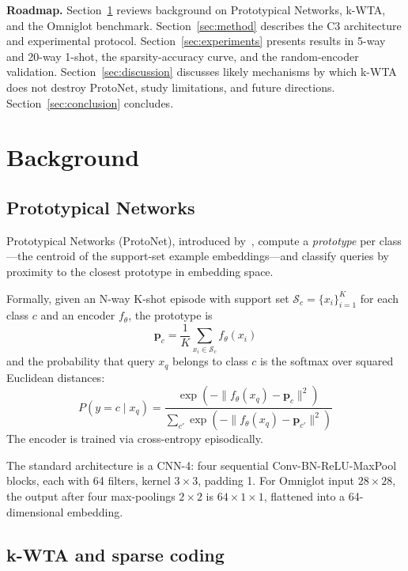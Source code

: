 \documentclass[11pt]{article}
\begin{document}
\textbf{Roadmap.} Section~\ref{sec:background} reviews background on Prototypical Networks, k-WTA, and the Omniglot benchmark. Section~\ref{sec:method} describes the C3 architecture and experimental protocol. Section~\ref{sec:experiments} presents results in 5-way and 20-way 1-shot, the sparsity-accuracy curve, and the random-encoder validation. Section~\ref{sec:discussion} discusses likely mechanisms by which k-WTA does not destroy ProtoNet, study limitations, and future directions. Section~\ref{sec:conclusion} concludes.

\section{Background}
\label{sec:background}

\subsection{Prototypical Networks}

Prototypical Networks (ProtoNet), introduced by~\citet{snell2017prototypical}, compute a \emph{prototype} per class---the centroid of the support-set example embeddings---and classify queries by proximity to the closest prototype in embedding space.

Formally, given an N-way K-shot episode with support set $\mathcal{S}_c = \{x_i\}_{i=1}^K$ for each class $c$ and an encoder $f_\theta$, the prototype is
\begin{equation}
\mathbf{p}_c = \frac{1}{K} \sum_{x_i \in \mathcal{S}_c} f_\theta(x_i)
\end{equation}
and the probability that query $x_q$ belongs to class $c$ is the softmax over squared Euclidean distances:
\begin{equation}
P(y=c \mid x_q) = \frac{\exp(-\|f_\theta(x_q) - \mathbf{p}_c\|^2)}{\sum_{c'} \exp(-\|f_\theta(x_q) - \mathbf{p}_{c'}\|^2)}
\end{equation}
The encoder is trained via cross-entropy episodically.

The standard architecture is a CNN-4: four sequential Conv-BN-ReLU-MaxPool blocks, each with 64 filters, kernel $3 \times 3$, padding 1. For Omniglot input $28 \times 28$, the output after four max-poolings $2 \times 2$ is $64 \times 1 \times 1$, flattened into a 64-dimensional embedding.

\subsection{k-WTA and sparse coding}
\end{document}

